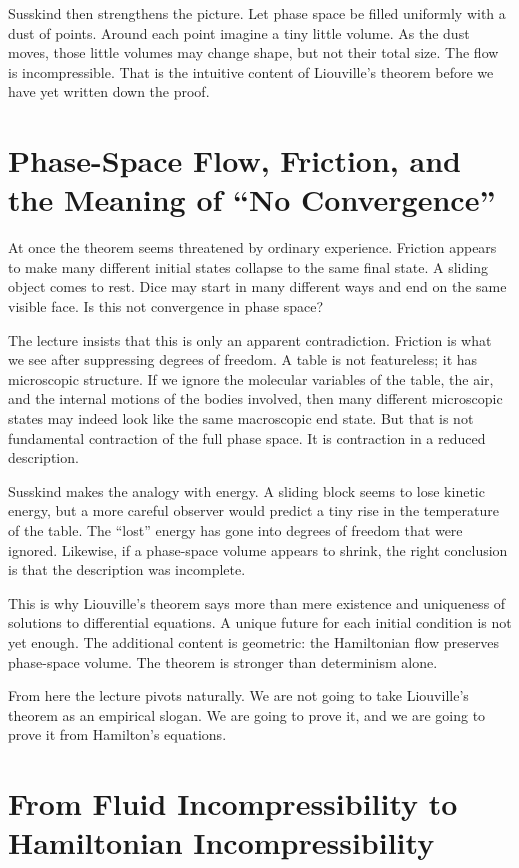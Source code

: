Susskind then strengthens the picture. Let phase space be filled uniformly with a dust of points. Around each point imagine a tiny little volume. As the dust moves, those little volumes may change shape, but not their total size. The flow is incompressible. That is the intuitive content of Liouville's theorem before we have yet written down the proof.

\section{Phase-Space Flow, Friction, and the Meaning of ``No Convergence''}

At once the theorem seems threatened by ordinary experience. Friction appears to make many different initial states collapse to the same final state. A sliding object comes to rest. Dice may start in many different ways and end on the same visible face. Is this not convergence in phase space?

The lecture insists that this is only an apparent contradiction. Friction is what we see after suppressing degrees of freedom. A table is not featureless; it has microscopic structure. If we ignore the molecular variables of the table, the air, and the internal motions of the bodies involved, then many different microscopic states may indeed look like the same macroscopic end state. But that is not fundamental contraction of the full phase space. It is contraction in a reduced description.

Susskind makes the analogy with energy. A sliding block seems to lose kinetic energy, but a more careful observer would predict a tiny rise in the temperature of the table. The ``lost'' energy has gone into degrees of freedom that were ignored. Likewise, if a phase-space volume appears to shrink, the right conclusion is that the description was incomplete.

This is why Liouville's theorem says more than mere existence and uniqueness of solutions to differential equations. A unique future for each initial condition is not yet enough. The additional content is geometric: the Hamiltonian flow preserves phase-space volume. The theorem is stronger than determinism alone.

From here the lecture pivots naturally. We are not going to take Liouville's theorem as an empirical slogan. We are going to prove it, and we are going to prove it from Hamilton's equations.

\section{From Fluid Incompressibility to Hamiltonian Incompressibility}

